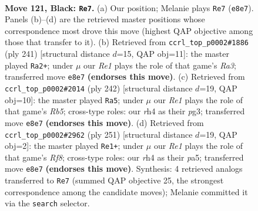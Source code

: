 \documentclass[11pt]{article}
\begin{document}
\clearpage

\begin{figure}[p]\centering
\begin{subfigure}{0.46\textwidth}\centering
\resizebox{\linewidth}{!}{%
\newchessgame
\chessboard[
  setfen={1k2r3/8/3Rp3/4P3/5P1R/8/4K3/8 b - - 28 121},
  showmover=false,
  pgfstyle=straightmove, color=movearrow, markmove={e8-e7}
]}
\caption{}
\end{subfigure}\hfill
\begin{subfigure}{0.46\textwidth}\centering
\resizebox{\linewidth}{!}{%
\newchessgame
\chessboard[
  setfen={8/8/r5k1/4R1p1/6P1/5P2/5K2/8 b - - 8 121},
  showmover=false,
  pgfstyle=straightmove, color=movearrow, markmove={a6-a2}
]}
\caption{}
\end{subfigure}
\\[4pt]
\begin{subfigure}{0.46\textwidth}\centering
\resizebox{\linewidth}{!}{%
\newchessgame
\chessboard[
  setfen={r7/6p1/P7/1R4P1/4k3/6p1/8/6K1 w - - 1 122},
  showmover=false,
  pgfstyle=straightmove, color=movearrow, markmove={b5-a5}
]}
\caption{}
\end{subfigure}\hfill
\begin{subfigure}{0.46\textwidth}\centering
\resizebox{\linewidth}{!}{%
\newchessgame
\chessboard[
  setfen={6k1/R4p2/7p/P3P3/4K3/8/8/5r2 b - - 2 126},
  showmover=false,
  pgfstyle=straightmove, color=movearrow, markmove={f1-e1}
]}
\caption{}
\end{subfigure}
\caption{\textbf{Move 121, Black: \texttt{Re7}.} (a) Our position; Melanie plays \texttt{Re7} (\texttt{e8e7}). Panels (b)--(d) are the retrieved master positions whose correspondence most drove this move (highest QAP objective among those that transfer to it). (b) Retrieved from \texttt{ccrl\_top\_p0002\#1886} (ply 241) [structural distance $d$=15, QAP obj=11]: the master played \texttt{Ra2+}; under $\mu$ our \emph{Re1} plays the role of that game's \emph{Ra3}; transferred move \texttt{e8e7} \textbf{(endorses this move)}. (c) Retrieved from \texttt{ccrl\_top\_p0002\#2014} (ply 242) [structural distance $d$=19, QAP obj=10]: the master played \texttt{Ra5}; under $\mu$ our \emph{Re1} plays the role of that game's \emph{Rb5}; cross-type roles: our \emph{r}h4 as their \emph{p}g3; transferred move \texttt{e8e7} \textbf{(endorses this move)}. (d) Retrieved from \texttt{ccrl\_top\_p0002\#2962} (ply 251) [structural distance $d$=19, QAP obj=2]: the master played \texttt{Re1+}; under $\mu$ our \emph{Re1} plays the role of that game's \emph{Rf8}; cross-type roles: our \emph{r}h4 as their \emph{p}a5; transferred move \texttt{e8e7} \textbf{(endorses this move)}. Synthesis: 4 retrieved analogs transferred to \texttt{Re7} (summed QAP objective 25, the strongest correspondence among the candidate moves); Melanie committed it via the \texttt{search} selector.}
\label{fig:thought-m241}
\end{figure}
\end{document}
